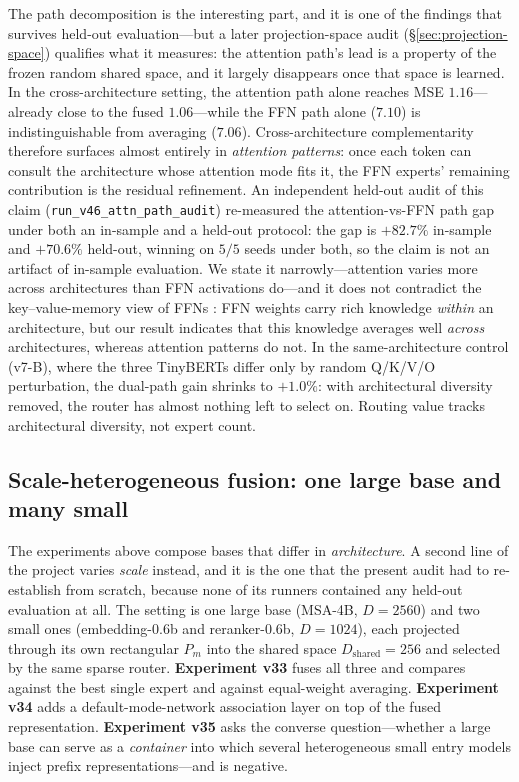 \documentclass[10pt,twoside]{article}
\theoremstyle{definition}
\theoremstyle{plain}
\theoremstyle{remark}
\begin{document}
The path decomposition is the interesting part, and it is one of the findings that survives held-out evaluation---but a later projection-space audit (\S\ref{sec:projection-space}) qualifies what it measures: the attention path's lead is a property of the frozen random shared space, and it largely disappears once that space is learned. In the cross-architecture setting, the attention path alone reaches MSE $1.16$---already close to the fused $1.06$---while the FFN path alone ($7.10$) is indistinguishable from averaging ($7.06$). Cross-architecture complementarity therefore surfaces almost entirely in \emph{attention patterns}: once each token can consult the architecture whose attention mode fits it, the FFN experts' remaining contribution is the residual refinement. An independent held-out audit of this claim (\texttt{run\_v46\_attn\_path\_audit}) re-measured the attention-vs-FFN path gap under both an in-sample and a held-out protocol: the gap is $+82.7\%$ in-sample and $+70.6\%$ held-out, winning on $5/5$ seeds under both, so the claim is not an artifact of in-sample evaluation. We state it narrowly---attention varies more across architectures than FFN activations do---and it does not contradict the key--value-memory view of FFNs \citep{geva2021,meng2022,dai2022}: FFN weights carry rich knowledge \emph{within} an architecture, but our result indicates that this knowledge averages well \emph{across} architectures, whereas attention patterns do not. In the same-architecture control (v7-B), where the three TinyBERTs differ only by random Q/K/V/O perturbation, the dual-path gain shrinks to $+1.0\%$: with architectural diversity removed, the router has almost nothing left to select on. Routing value tracks architectural diversity, not expert count.

\subsection{Scale-heterogeneous fusion: one large base and many small}
\label{sec:scale-hetero-exp}

The experiments above compose bases that differ in \emph{architecture}. A second line of the project
varies \emph{scale} instead, and it is the one that the present audit had to re-establish from
scratch, because none of its runners contained any held-out evaluation at all. The setting is one
large base (MSA-4B, $D=2560$) and two small ones (embedding-0.6b and reranker-0.6b, $D=1024$),
each projected through its own rectangular $P_m$ into the shared space $D_{\text{shared}}{=}256$ and
selected by the same sparse router. \textbf{Experiment v33} fuses all three and compares against the
best single expert and against equal-weight averaging. \textbf{Experiment v34} adds a
default-mode-network association layer on top of the fused representation. \textbf{Experiment v35}
asks the converse question---whether a large base can serve as a \emph{container} into which several
heterogeneous small entry models inject prefix representations---and is negative.
\end{document}
